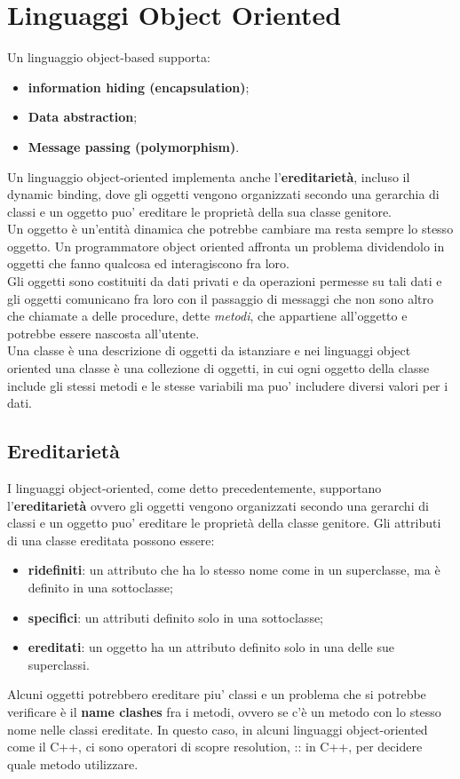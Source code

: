 \documentclass[12pt]{report}
\begin{document}
	\section{Linguaggi Object Oriented}
	Un linguaggio object-based supporta:
	\begin{itemize}
		\item \textbf{information hiding (encapsulation)};
		\item \textbf{Data abstraction};
		\item \textbf{Message passing (polymorphism)}.
	\end{itemize}
	Un linguaggio object-oriented implementa anche l'\textbf{ereditarietà}, incluso il dynamic binding, dove gli oggetti vengono organizzati secondo una gerarchia di classi e un oggetto puo' ereditare le proprietà della sua classe genitore. \\
	Un oggetto è un'entità dinamica che potrebbe cambiare ma resta sempre lo stesso oggetto. Un programmatore object oriented affronta un problema dividendolo in oggetti che fanno qualcosa ed interagiscono fra loro. \\
	Gli oggetti sono costituiti da dati privati e da operazioni permesse su tali dati e gli oggetti comunicano fra loro con il passaggio di messaggi che non sono altro che chiamate a delle procedure, dette \textit{metodi}, che appartiene all'oggetto e potrebbe essere nascosta all'utente. \\
	Una classe è una descrizione di oggetti da istanziare e nei linguaggi object oriented una classe è una collezione di oggetti, in cui ogni oggetto della classe include gli stessi metodi e le stesse variabili ma puo' includere diversi valori per i dati.
	\subsection{Ereditarietà}
	I linguaggi object-oriented, come detto precedentemente, supportano l'\textbf{ereditarietà} ovvero gli oggetti vengono organizzati secondo una gerarchi di classi e un oggetto puo' ereditare le proprietà della classe genitore. Gli attributi di una classe ereditata possono essere:
	\begin{itemize}
		\item \textbf{ridefiniti}: un attributo che ha lo stesso nome come in un superclasse, ma è definito in una sottoclasse;
		\item \textbf{specifici}: un attributi definito solo in una sottoclasse;
		\item \textbf{ereditati}: un oggetto ha un attributo definito solo in una delle sue superclassi.
	\end{itemize}
	Alcuni oggetti potrebbero ereditare piu' classi e un problema che si potrebbe verificare è il \textbf{name clashes} fra i metodi, ovvero se c'è un metodo con lo stesso nome nelle classi ereditate. In questo caso, in alcuni linguaggi object-oriented come il C++, ci sono operatori di scopre resolution, :: in C++, per decidere quale metodo utilizzare.
\end{document}
